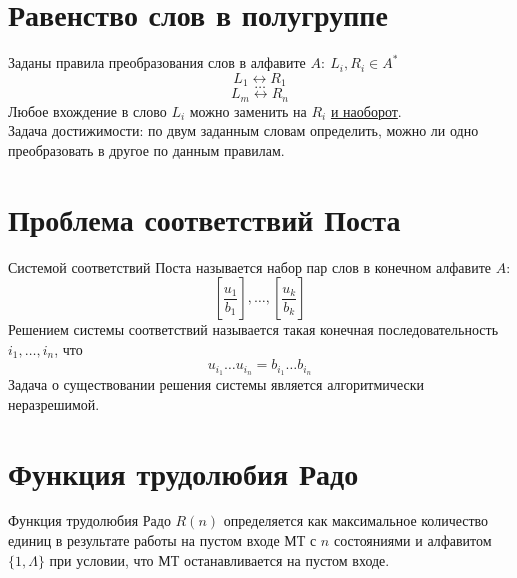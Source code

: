 \documentclass[11pt]{article}
\begin{document}
\section{Равенство слов в полугруппе}

\begin{definition}
  Заданы правила преобразования слов в алфавите $A: \ L_i, R_i \in 
  A^{\ast}$
  \[L_1 \leftrightarrow R_1\]
  \[\dots\]
  \[L_m \leftrightarrow R_n\]
  Любое вхождение в слово $L_i$ можно заменить на $R_i$ \underline{и 
  наоборот}. \\
  Задача достижимости: по двум заданным словам определить, можно 
  ли одно преобразовать в другое по данным правилам.
\end{definition}

\section{Проблема соответствий Поста}

\begin{definition}
  Системой соответствий Поста называется набор пар слов в конечном 
  алфавите $A$:
  \[\left[\frac{u_1}{b_1}\right], \dots, \left[\frac{u_k}{b_k}\right]\]
  Решением системы соответствий называется такая конечная 
  последовательность $i_1, \ldots, i_n$, что 
  \[u_{i_1} \ldots u_{i_n} = b_{i_1} \ldots b_{i_n}\]
  Задача о существовании решения системы является алгоритмически 
  неразрешимой.
\end{definition}

\section{Функция трудолюбия Радо}

\begin{definition}
  Функция трудолюбия Радо $R(n)$ определяется как максимальное количество 
  единиц в результате работы на пустом входе МТ с $n$ состояниями и алфавитом 
  $\{1,\varLambda\}$ при условии, что МТ останавливается на пустом входе.
\end{definition}
\end{document}
